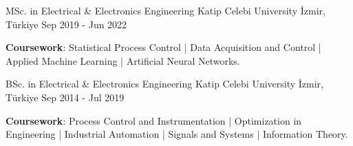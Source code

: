 

\begin{cventries}

  \cventry
    {MSc. in Electrical \& Electronics Engineering} %
    {Katip Celebi University} %
    {İzmir, Türkiye} %
    {Sep 2019 - Jun 2022} %
    {
      \begin{cvitems} %
        \textbf{Coursework}: Statistical Process Control | Data Acquisition and Control | Applied Machine Learning | Artificial Neural Networks.
      \end{cvitems}
    }

  \cventry
    {BSc. in Electrical \& Electronics Engineering} %
    {Katip Celebi University} %
    {İzmir, Türkiye} %
    {Sep 2014 - Jul 2019} %
    {
      \begin{cvitems} %
        \textbf{Coursework}: Process Control and Instrumentation | Optimization in Engineering | Industrial Automation | Signals and Systems | Information Theory.
      \end{cvitems}
    }

\end{cventries}
